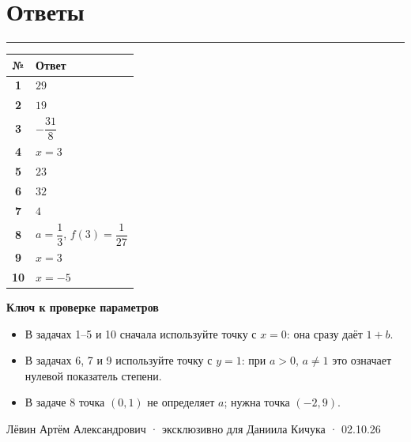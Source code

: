 \documentclass[a4paper,12pt]{article}
\newcommand{\sectionline}{\par\vspace{2pt}\noindent\color{accent}\rule{\linewidth}{0.6pt}\par\color{textgray}\vspace{4pt}}
\begin{document}
\clearpage
\section*{Ответы}
\sectionline
\renewcommand{\arraystretch}{1.35}
\begin{tabularx}{\linewidth}{@{}>{\bfseries}c X@{}}
\toprule
№ & Ответ\\
\midrule
1 & $29$\\
2 & $19$\\
3 & $-\dfrac{31}{8}$\\
4 & $x=3$\\
5 & $23$\\
6 & $32$\\
7 & $4$\\
8 & $a=\dfrac13$, \quad $f(3)=\dfrac1{27}$\\
9 & $x=3$\\
10 & $x=-5$\\
\bottomrule
\end{tabularx}

\vspace{12mm}
\textbf{Ключ к проверке параметров}
\begin{itemize}
  \item В задачах 1--5 и 10 сначала используйте точку с $x=0$: она сразу даёт $1+b$.
  \item В задачах 6, 7 и 9 используйте точку с $y=1$: при $a>0$, $a\ne1$ это означает нулевой показатель степени.
  \item В задаче 8 точка $(0,1)$ не определяет $a$; нужна точка $(-2,9)$.
\end{itemize}

\vfill
\begin{center}
\small\color{softgray}Лёвин Артём Александрович · эксклюзивно для Даниила Кичука · 02.10.26
\end{center}
\end{document}
